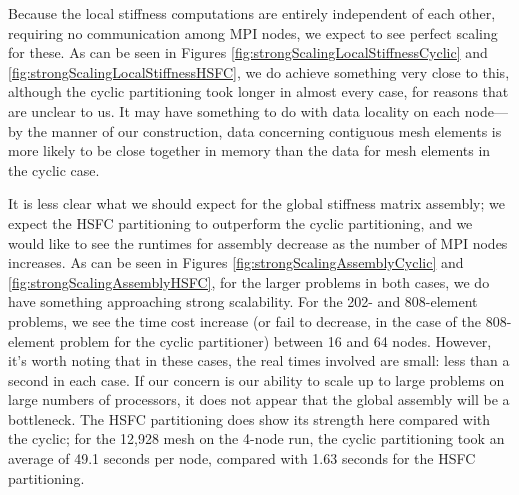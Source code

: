 \documentclass{article}
\begin{document}
Because the local stiffness computations are entirely independent of each other, requiring no communication among MPI nodes, we expect to see perfect scaling for these.  As can be seen in Figures \ref{fig:strongScalingLocalStiffnessCyclic} and \ref{fig:strongScalingLocalStiffnessHSFC}, we do achieve something very close to this, although the cyclic partitioning took longer in almost every case, for reasons that are unclear to us.  It may have something to do with data locality on each node---by the manner of our construction, data concerning contiguous mesh elements is more likely to be close together in memory than the data for mesh elements in the cyclic case.

It is less clear what we should expect for the global stiffness matrix assembly; we expect the HSFC partitioning to outperform the cyclic partitioning, and we would like to see the runtimes for assembly decrease as the number of MPI nodes increases.  As can be seen in Figures \ref{fig:strongScalingAssemblyCyclic} and \ref{fig:strongScalingAssemblyHSFC}, for the larger problems in both cases, we do have something approaching strong scalability.  For the 202- and 808-element problems, we see the time cost increase (or fail to decrease, in the case of the 808-element problem for the cyclic partitioner) between 16 and 64 nodes.  However, it's worth noting that in these cases, the real times involved are small: less than a second in each case.  If our concern is our ability to scale up to large problems on large numbers of processors, it does not appear that the global assembly will be a bottleneck.  The HSFC partitioning does show its strength here compared with the cyclic; for the 12,928 mesh on the 4-node run, the cyclic partitioning took an average of 49.1 seconds per node, compared with 1.63 seconds for the HSFC partitioning.
\end{document}

